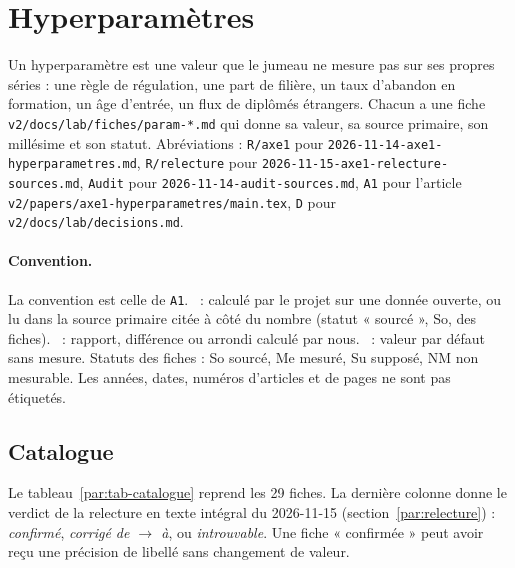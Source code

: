 \providecommand{\donfic}[1]{\nolinkurl{#1}}
\section{Hyperparamètres}\label{par:sec}\label{sec:parametres-ref}
\begingroup\setlength{\emergencystretch}{3em}%

Un hyperparamètre est une valeur que le jumeau ne mesure pas sur ses propres séries : une règle de régulation,
une part de filière, un taux d'abandon en formation, un âge d'entrée, un flux de diplômés étrangers. Chacun a
une fiche \donfic{v2/docs/lab/fiches/param-*.md} qui donne sa valeur, sa source primaire, son millésime et son
statut. Abréviations : \donfic{R/axe1} pour \donfic{2026-11-14-axe1-hyperparametres.md}, \donfic{R/relecture}
pour \donfic{2026-11-15-axe1-relecture-sources.md}, \texttt{Audit} pour \donfic{2026-11-14-audit-sources.md},
\texttt{A1} pour l'article \donfic{v2/papers/axe1-hyperparametres/main.tex}, \texttt{D} pour
\donfic{v2/docs/lab/decisions.md}.

\paragraph{Convention.} La convention est celle de \texttt{A1}. \mesure{}~: calculé par le projet sur une
donnée ouverte, ou lu dans la source primaire citée à côté du nombre (statut « sourcé », So, des fiches).
\derive{}~: rapport, différence ou arrondi calculé par nous. \suppose{}~: valeur par défaut sans mesure.
Statuts des fiches : So sourcé, Me mesuré, Su supposé, NM non mesurable. Les années, dates, numéros
d'articles et de pages ne sont pas étiquetés.

\subsection{Catalogue}\label{par:catalogue}

Le tableau~\ref{par:tab-catalogue} reprend les 29\mesure{} fiches. La dernière colonne donne le verdict de la
relecture en texte intégral du 2026-11-15 (section~\ref{par:relecture}) : \emph{confirmé}, \emph{corrigé de
$\to$ à}, ou \emph{introuvable}. Une fiche « confirmée » peut avoir reçu une précision de libellé sans
changement de valeur.

